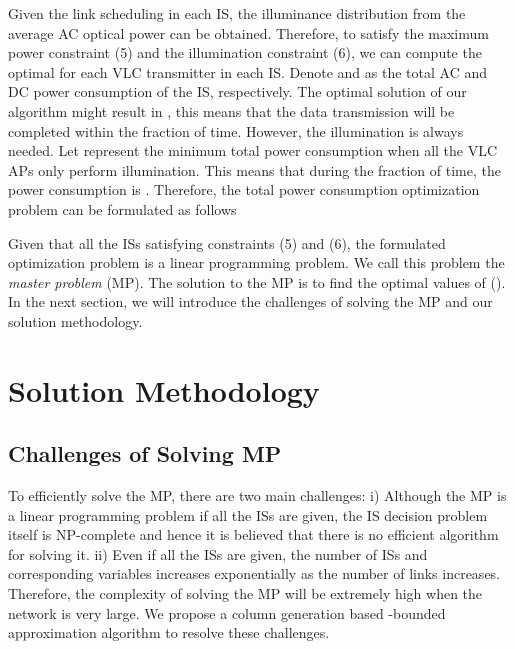 \documentclass[10pt,journal]{IEEEtran}
\begin{document}
Given the link scheduling in each IS, the illuminance distribution from the average AC optical power can be obtained. Therefore, to satisfy the maximum power constraint (5) and the illumination constraint (6), we can compute the optimal  for each VLC transmitter in each IS. Denote  and  as the total AC and DC power consumption of the  IS, respectively. The optimal solution of our algorithm might result in , this means that the data transmission will be completed within the  fraction of time. However, the illumination is always needed. Let  represent the minimum total power consumption when all the VLC APs only perform illumination. This means that during the  fraction of time, the power consumption is . Therefore, the total power consumption optimization problem can be formulated as follows




Given that all the ISs satisfying constraints (5) and (6), the formulated optimization problem is a linear programming problem. We call this problem the {\it master problem} (MP). The solution to the MP is to find the optimal values of  (). In the next section, we will introduce the challenges of solving the MP and our solution methodology.

\section{Solution Methodology}\label{solution_methodology}
\subsection{Challenges of Solving MP}
To efficiently solve the MP, there are two main challenges: i) Although the MP is a linear programming problem if all the ISs are given, the IS decision problem itself is NP-complete \cite{diestel2005graph} and hence it is believed that there is no efficient algorithm for solving it. ii) Even if all the ISs are given, the number of ISs and corresponding variables increases exponentially as the number of links increases. Therefore, the complexity of solving the MP will be extremely high when the network is very large. We propose a column generation based -bounded approximation algorithm to resolve these challenges.
\end{document}

